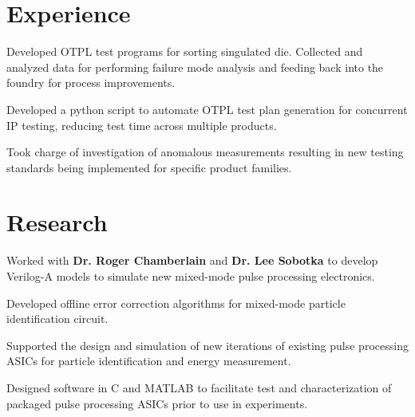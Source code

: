 \documentclass[]{deedy-resume-openfont}
\begin{document}
\begin{minipage}[t]{0.66\textwidth} 


\section{Experience}
\vspace{\topsep} %
\begin{tightemize}
\item Developed OTPL test programs for sorting singulated die. Collected and analyzed data for performing failure mode analysis and feeding back into the foundry for process improvements. 
\item Developed a python script to automate OTPL test plan generation for concurrent IP testing, reducing test time across multiple products.
\item Took charge of investigation of anomalous measurements resulting in new testing standards being implemented for specific product families.
\end{tightemize}
\sectionsep


\section{Research}
\begin{tightemize}
\item Worked with \textbf{Dr. Roger Chamberlain} and \textbf{Dr. Lee Sobotka} to develop Verilog-A models to simulate new mixed-mode pulse processing electronics.
\item Developed offline error correction algorithms for mixed-mode particle identification circuit.
\item Supported the design and simulation of new iterations of existing pulse processing ASICs for particle identification and energy measurement.
\item Designed software in C and MATLAB to facilitate test and characterization of packaged pulse processing ASICs prior to use in experiments.
\end{tightemize}
\sectionsep


\end{minipage}
\end{document}
